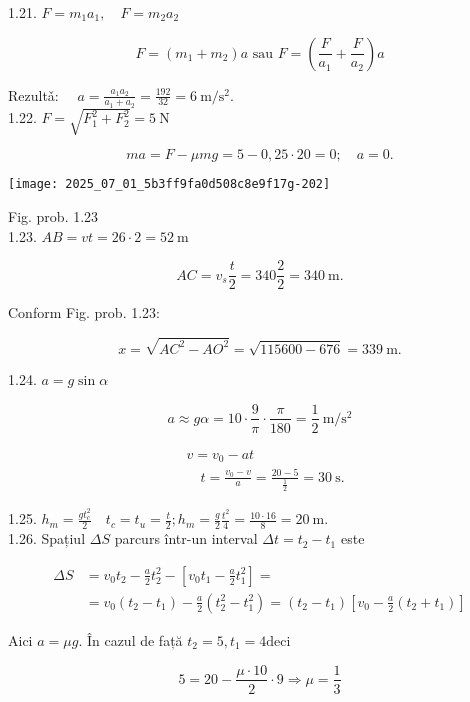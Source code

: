 1.21. $F=m_{1} a_{1}, \quad F=m_{2} a_{2}$

$$
F=\left(m_{1}+m_{2}\right) a \text { sau } F=\left(\frac{F}{a_{1}}+\frac{F}{a_{2}}\right) a
$$

Rezultǎ: $\quad a=\frac{a_{1} a_{2}}{a_{1}+a_{2}}=\frac{192}{32}=6 \mathrm{~m} / \mathrm{s}^{2}$.\\
1.22. $F=\sqrt{F_{1}^{2}+F_{2}^{2}}=5 \mathrm{~N}$

$$
m a=F-\mu m g=5-0,25 \cdot 20=0 ; \quad a=0 .
$$

\begin{center}
\texttt{[image: 2025\_07\_01\_5b3ff9fa0d508c8e9f17g-202]}
\end{center}

Fig. prob. 1.23\\
1.23. $A B=v t=26 \cdot 2=52 \mathrm{~m}$

$$
A C=v_{s} \frac{t}{2}=340 \frac{2}{2}=340 \mathrm{~m} .
$$

Conform Fig. prob. 1.23:

$$
x=\sqrt{A C^{2}-A O^{2}}=\sqrt{115600-676}=339 \mathrm{~m} .
$$

1.24. $a=g \sin \alpha$

$$
a \approx g \alpha=10 \cdot \frac{9}{\pi} \cdot \frac{\pi}{180}=\frac{1}{2} \mathrm{~m} / \mathrm{s}^{2}
$$

$$
\begin{aligned}
& v=v_{0}-a t \\
& \quad t=\frac{v_{0}-v}{a}=\frac{20-5}{\frac{1}{2}}=30 \mathrm{~s} .
\end{aligned}
$$

1.25. $h_{m}=\frac{g t_{c}^{2}}{2} \quad t_{c}=t_{u}=\frac{t}{2} ; h_{m}=\frac{g}{2} \frac{t^{2}}{4}=\frac{10 \cdot 16}{8}=20 \mathrm{~m}$.\\
1.26. Spațiul $\Delta S$ parcurs într-un interval $\Delta t=t_{2}-t_{1}$ este

$$
\begin{aligned}
\Delta S & =v_{0} t_{2}-\frac{a}{2} t_{2}^{2}-\left[v_{0} t_{1}-\frac{a}{2} t_{1}^{2}\right]= \\
& =v_{0}\left(t_{2}-t_{1}\right)-\frac{a}{2}\left(t_{2}^{2}-t_{1}^{2}\right)=\left(t_{2}-t_{1}\right)\left[v_{0}-\frac{a}{2}\left(t_{2}+t_{1}\right)\right]
\end{aligned}
$$

Aici $a=\mu g$. În cazul de față $t_{2}=5, t_{1}=4 \mathrm{deci}$

$$
5=20-\frac{\mu \cdot 10}{2} \cdot 9 \Rightarrow \mu=\frac{1}{3}
$$

